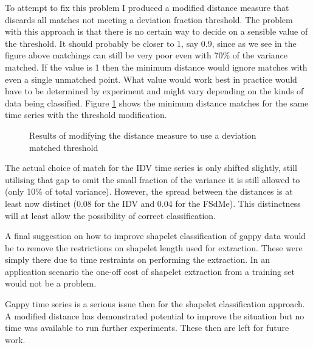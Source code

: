 To attempt to fix this problem I produced a modified distance measure that discards all matches not meeting a deviation fraction threshold. The problem with this approach is that there is no certain way to decide on a sensible value of the threshold. It should probably be closer to 1, say 0.9, since as we see in the figure above matchings can still be very poor even with 70\% of the variance matched. If the value is 1 then the minimum distance would ignore matches with even a single unmatched point. What value would work best in practice would have to be determined by experiment and might vary depending on the kinds of data being classified. Figure \ref{fig:modifieddistance} shows the minimum distance matches for the same time series with the threshold modification.

\begin{figure}[ht!]
	\label{fig:modifieddistance}
	\caption{Results of modifying the distance measure to use a deviation matched threshold}
\end{figure}
The actual choice of match for the IDV time series is only shifted slightly, still utilising that gap to omit the small fraction of the variance it is still allowed to (only 10\% of total variance). However, the spread between the distances is at least now distinct (0.08 for the IDV and 0.04 for the FSdMe). This distinctness will at least allow the possibility of correct classification.

A final suggestion on how to improve shapelet classification of gappy data would be to remove the restrictions on shapelet length used for extraction. These were simply there due to time restraints on performing the extraction. In an application scenario the one-off cost of shapelet extraction from a training set would not be a problem.

Gappy time series is a serious issue then for the shapelet classification approach. A modified distance has demonstrated potential to improve the situation but no time was available to run further experiments. These then are left for future work.

